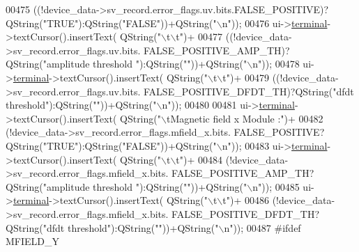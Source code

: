 \begin{DoxyCode}
00475                                             ((!device\_data->sv\_record.error\_flags.uv.bits.FALSE\_POSITIVE)?
      QString(\textcolor{stringliteral}{"TRUE"}):QString(\textcolor{stringliteral}{"FALSE"}))+QString(\textcolor{stringliteral}{"\(\backslash\)n"}));
00476        ui->\hyperlink{a00027_aae71c46ea4546df5994735dee573b2dd}{terminal}->textCursor().insertText( QString(\textcolor{stringliteral}{"\(\backslash\)t\(\backslash\)t"})+
00477                                             ((!device\_data->sv\_record.error\_flags.uv.bits.
      FALSE\_POSITIVE\_AMP\_TH)?QString(\textcolor{stringliteral}{"amplitude threshold "}):QString(\textcolor{stringliteral}{""}))+QString(\textcolor{stringliteral}{"\(\backslash\)n"}));
00478        ui->\hyperlink{a00027_aae71c46ea4546df5994735dee573b2dd}{terminal}->textCursor().insertText( QString(\textcolor{stringliteral}{"\(\backslash\)t\(\backslash\)t"})+
00479                                             ((!device\_data->sv\_record.error\_flags.uv.bits.
      FALSE\_POSITIVE\_DFDT\_TH)?QString(\textcolor{stringliteral}{"dfdt threshold"}):QString(\textcolor{stringliteral}{""}))+QString(\textcolor{stringliteral}{"\(\backslash\)n"}));
00480 
00481        ui->\hyperlink{a00027_aae71c46ea4546df5994735dee573b2dd}{terminal}->textCursor().insertText( QString(\textcolor{stringliteral}{"\(\backslash\)tMagnetic field x Module :"})+
00482                                             (!device\_data->sv\_record.error\_flags.mfield\_x.bits.
      FALSE\_POSITIVE?QString(\textcolor{stringliteral}{"TRUE"}):QString(\textcolor{stringliteral}{"FALSE"}))+QString(\textcolor{stringliteral}{"\(\backslash\)n"}));
00483        ui->\hyperlink{a00027_aae71c46ea4546df5994735dee573b2dd}{terminal}->textCursor().insertText( QString(\textcolor{stringliteral}{"\(\backslash\)t\(\backslash\)t"})+
00484                                             (!device\_data->sv\_record.error\_flags.mfield\_x.bits.
      FALSE\_POSITIVE\_AMP\_TH?QString(\textcolor{stringliteral}{"amplitude threshold "}):QString(\textcolor{stringliteral}{""}))+QString(\textcolor{stringliteral}{"\(\backslash\)n"}));
00485        ui->\hyperlink{a00027_aae71c46ea4546df5994735dee573b2dd}{terminal}->textCursor().insertText( QString(\textcolor{stringliteral}{"\(\backslash\)t\(\backslash\)t"})+
00486                                             (!device\_data->sv\_record.error\_flags.mfield\_x.bits.
      FALSE\_POSITIVE\_DFDT\_TH?QString(\textcolor{stringliteral}{"dfdt threshold"}):QString(\textcolor{stringliteral}{""}))+QString(\textcolor{stringliteral}{"\(\backslash\)n"}));
00487 \textcolor{preprocessor}{#ifdef MFIELD\_Y}

\end{DoxyCode}
